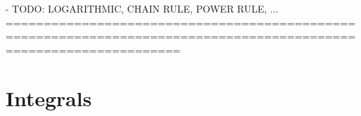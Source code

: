 \documentclass{book}
\begin{document}
	- TODO: LOGARITHMIC, CHAIN RULE, POWER RULE, ...
	===================================================================================================================
\section{Integrals}


\begin{comment}
TODO:
- maybe dont abbreviate
-\txt formatting
-definitions should be iff
	===================================================================================================================

Hotkeys:
Ctrl+R: find reference
Ctrl+K, Ctrl+1: code fold all
Ctrl+K, Ctrl+J: code unfold all
Ctrl+Shift+[: code fold
Ctrl+Shift+]: code unfold
Ctrl+Shift+Right-click+Drag: block select
Ctrl+Space: display auto-complete
Tab: tab trigger auto-complete
Shift+Tab: force tab

=== math.sublime-completions ===
{ "completions": [

{ "trigger": "fl\t\\forall", "contents": "\\forall " },
{ "trigger": "es\t\\exists", "contents": "\\exists " },
{ "trigger": "ev\t\\equiv", "contents": "\\equiv " },
{ "trigger": "es\t\\implies", "contents": "\\implies " },
{ "trigger": "if\t\\iff", "contents": "\\iff " },
{ "trigger": "and\t\\land", "contents": "\\land " },
{ "trigger": "or\t\\lor", "contents": "\\lor " },
{ "trigger": "not\t\\lnot", "contents": "\\lnot " },
{ "trigger": "dr\t\\vdash", "contents": "\\vdash " },
{ "trigger": "md\t\\vDash", "contents": "\\vDash " },
{ "trigger": "cl\t\\mathcal", "contents": "\\mathcal{}" },
{ "trigger": "fk\t\\mathfrak", "contents": "\\mathfrak{}" },
{ "trigger": "mb\t\\mathbb", "contents": "\\mathbb{}" },
{ "trigger": "nit\t\\inot", "contents": "\\inot " },
{ "trigger": "cr\t\\contr", "contents": "\\contr " },
{ "trigger": "phr\t\\placeholder", "contents": "\\placeholder" },


\end{comment}
\end{document}
